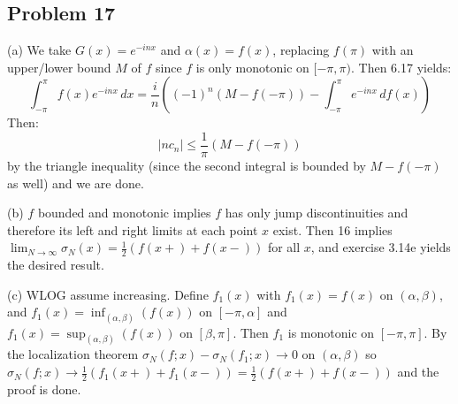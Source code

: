 \documentclass{amsart}
\begin{document}
\subsection*{Problem 17}
(a) We take $G(x)=e^{-inx}$ and $\alpha(x)=f(x)$, replacing $f(\pi)$ with an upper/lower bound $M$ of $f$ since $f$ is only monotonic on $[-\pi, \pi)$. Then 6.17 yields:
\[\int_{-\pi}^\pi f(x)e^{-inx}\,dx=\frac{i}{n}\left((-1)^n(M-f(-\pi))-\int_{-\pi}^\pi e^{-inx}\,df(x)\right)\]
Then: \[|nc_n|\leq\frac{1}{\pi}(M-f(-\pi))\] by the triangle inequality (since the second integral is bounded by $M-f(-\pi)$ as well) and we are done.

\medskip \noindent (b) $f$ bounded and monotonic implies $f$ has only jump discontinuities and therefore its left and right limits at each point $x$ exist. Then 16 implies $\lim_{N\to\infty}\sigma_N(x)=\frac{1}{2}(f(x+)+f(x-))$ for all $x$, and exercise 3.14e yields the desired result.

\medskip \noindent (c) WLOG assume increasing. Define $f_1(x)$ with $f_1(x)=f(x)$ on $(\alpha, \beta)$, and $f_1(x)=\inf_{(\alpha,\beta)}(f(x))$ on $[-\pi, \alpha]$ and $f_1(x) = \sup_{(\alpha, \beta)}(f(x))$ on $[\beta, \pi]$. Then $f_1$ is monotonic on $[-\pi, \pi]$. By the localization theorem $\sigma_N(f;x)-\sigma_N(f_1;x)\to 0$ on $(\alpha, \beta)$ so $\sigma_N(f;x)\to \frac{1}{2}(f_1(x+)+f_1(x-))=\frac{1}{2}(f(x+)+f(x-))$ and the proof is done.
\end{document}

